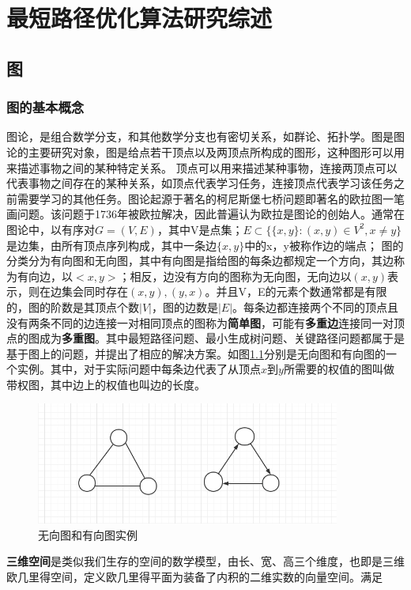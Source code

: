 \chapter{最短路径优化算法研究综述}

\section{图}

\subsection{图的基本概念}
图论，是组合数学分支，和其他数学分支也有密切关系，如群论、拓扑学。图是图论的主要研究对象，图是给点若干顶点以及两顶点所构成的图形，这种图形可以用来描述事物之间的某种特定关系。
顶点可以用来描述某种事物，连接两顶点可以代表事物之间存在的某种关系，如顶点代表学习任务，连接顶点代表学习该任务之前需要学习的其他任务。图论起源于著名的柯尼斯堡七桥问题即著名的欧拉图一笔画问题。该问题于1736年被欧拉解决，因此普遍认为欧拉是图论的创始人\cite{r1}。通常在图论中，以有序对$G=(V,E)$，其中V是点集；$E\subset \{\{x, y\}:(x,y)\in V^2,x\ne y\}$是边集，由所有顶点序列构成，其中一条边$\{x,y\}$中的x，y被称作边的端点；
图的分类分为有向图和无向图，其中有向图是指给图的每条边都规定一个方向，其边称为有向边，以$<x,y>$；相反，边没有方向的图称为无向图，无向边以$(x,y)$表示，则在边集会同时存在$(x,y),(y,x)$。并且V，E的元素个数通常都是有限的，图的阶数是其顶点个数$|V|$，图的边数是$|E|$。每条边都连接两个不同的顶点且没有两条不同的边连接一对相同顶点的图称为\textbf{简单图}，可能有\textbf{多重边}连接同一对顶点的图成为\textbf{多重图}。其中最短路径问题、最小生成树问题、关键路径问题都属于是基于图上的问题，并提出了相应的解决方案。如图\ref{fig:graph_ex}分别是无向图和有向图的一个实例。其中，对于实际问题中每条边代表了从顶点$x$到$y$所需要的权值的图叫做带权图，其中边上的权值也叫边的长度。
\begin{figure}[h]
  \centering
  \includegraphics[width=10cm]{figures/graph_ex.png}
  \caption{无向图和有向图实例}  
  \label{fig:graph_ex}
\end{figure}
\par\textbf{三维空间}是类似我们生存的空间的数学模型，由长、宽、高三个维度，也即是三维欧几里得空间，定义欧几里得平面为装备了内积的二维实数的向量空间。满足
